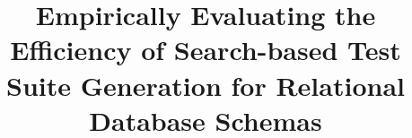 \documentclass{sig-alternate}
\begin{document}
%

\title{Empirically Evaluating the Efficiency of Search-based Test Suite
Generation for Relational Database Schemas}
%
%
%
%
%
\end{document}
